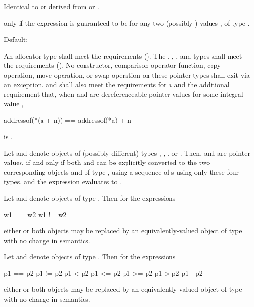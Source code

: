 \begin{itemdescr}
\pnum
\result
Identical to or derived from  or .

\pnum
\returns
{} only if the expression  is guaranteed
to be  for any two (possibly ) values
,  of type .

\pnum
\remarks
Default: 
\end{itemdescr}

\pnum
An allocator type  shall meet the
 requirements ().
The , , , and
 types shall meet the
 requirements ().
No constructor,
comparison operator function, copy operation, move operation, or swap operation on
these pointer types shall exit via an exception.  and  shall also
meet the requirements for
a  and
the additional requirement that, when  and  are
dereferenceable pointer values for some integral value ,
\begin{codeblock}
addressof(*(a + n)) == addressof(*a) + n
\end{codeblock}
is .

\pnum
Let  and  denote objects of (possibly different) types
, , ,
or . Then,  and  are
 pointer values, if and only if both  and 
can be explicitly converted to the two corresponding objects  and 
of type , using a sequence of s
using only these four types, and the expression 
evaluates to .

\pnum
Let  and  denote objects of type .
Then for the expressions
\begin{codeblock}
w1 == w2
w1 != w2
\end{codeblock}
either or both objects may be replaced by an equivalently-valued object of type
 with no change in semantics.

\pnum
Let  and  denote objects of type .
Then for the expressions
\begin{codeblock}
p1 == p2
p1 != p2
p1 < p2
p1 <= p2
p1 >= p2
p1 > p2
p1 - p2
\end{codeblock}
either or both objects may be replaced by an equivalently-valued object of type
 with no change in semantics.


